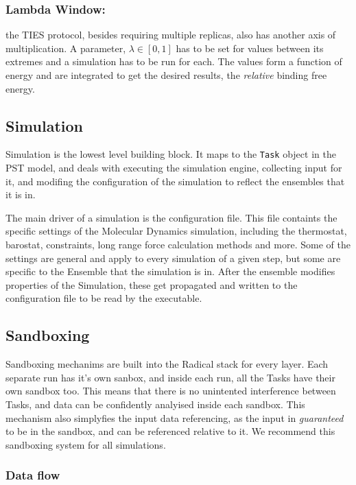 \subsubsection{Lambda Window:}

the TIES protocol, besides requiring multiple replicas, also has another axis of multiplication. A parameter, $\lambda \in [0, 1]$ has to be set for values between its extremes and a simulation has to be run for each. The values form a function of energy and are integrated to get the desired results, the \emph{relative} binding free energy.


\subsection{Simulation}

Simulation is the lowest level building block. It maps to the \texttt{Task} object in the PST model, and deals with executing the simulation engine, collecting input for it, and modifing the configuration of the simulation to reflect the ensembles that it is in.

The main driver of a simulation is the configuration file. This file containts the specific settings of the Molecular Dynamics simulation, including the thermostat, barostat, constraints, long range force calculation methods and more. Some of the settings are general and apply to every simulation of a given step, but some are specific to the Ensemble that the simulation is in. After the ensemble modifies properties of the Simulation, these get propagated and written to the configuration file to be read by the executable.

\subsection{Sandboxing}

Sandboxing mechanims are built into the Radical stack for every layer. Each separate run has it's own sanbox, and inside each run, all the Tasks have their own sandbox too. This means that there is no unintented interference between Tasks, and data can be confidently analyised inside each sandbox. This mechanism also simplyfies the input data referencing, as the input in \emph{guaranteed} to be in the sandbox, and can be referenced relative to it. We recommend this sandboxing system for all simulations.

\subsubsection{Data flow}

